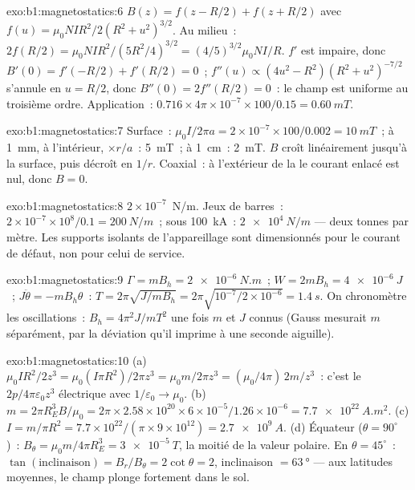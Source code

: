 \begin{solution}{exo:b1:magnetostatics:6}
$B(z) = f(z - R/2) + f(z + R/2)$ avec $f(u) = \mu_0NIR^2/2(R^2 + u^2)^{3/2}$.
Au milieu~: $2f(R/2) = \mu_0NIR^2/(5R^2/4)^{3/2} = (4/5)^{3/2}\mu_0NI/R$. $f'$ est
impaire, donc $B'(0) = f'(-R/2) + f'(R/2) = 0$~; $f''(u) \propto (4u^2 - R^2)(R^2 +
u^2)^{-7/2}$ s'annule en $u = R/2$, donc $B''(0) = 2f''(R/2) = 0$~: le champ est
uniforme au troisième ordre. Application~: $0.716 \times 4\pi \times 10^{-7} \times 100/0.15 =
\qty{0.60}{mT}$.
\end{solution}

\begin{solution}{exo:b1:magnetostatics:7}
Surface~: $\mu_0I/2\pi a = 2 \times 10^{-7} \times 100/0.002 = \qty{10}{mT}$~; à
\qty{1}{mm}, à l'intérieur, $\times r/a$~: \qty{5}{mT}~; à \qty{1}{cm}~: \qty{2}{mT}. $B$ croît
linéairement jusqu'à la surface, puis décroît en $1/r$. Coaxial~: à l'extérieur
de la  le courant enlacé est nul, donc $B = 0$.
\end{solution}

\begin{solution}{exo:b1:magnetostatics:8}
$2 \times 10^{-7}$~N/m. Jeux de barres~: $2 \times 10^{-7} \times 10^8/0.1 = \qty{200}{N/m}$~;
sous \qty{100}{kA}~: $\qty{2e4}{N/m}$ --- deux tonnes par mètre. Les supports
isolants de l'appareillage sont dimensionnés pour le courant de défaut, non
pour celui de service.
\end{solution}

\begin{solution}{exo:b1:magnetostatics:9}
$\Gamma = mB_h = \qty{2e-6}{N.m}$~; $W = 2mB_h = \qty{4e-6}{J}$~; $J\ddot\theta =
-mB_h\theta$~: $T = 2\pi\sqrt{J/mB_h} = 2\pi\sqrt{10^{-7}/2 \times 10^{-6}} =
\qty{1.4}{s}$. On chronomètre les oscillations~: $B_h = 4\pi^2J/mT^2$ une fois $m$ et $J$
connus (Gauss mesurait $m$ séparément, par la déviation qu'il imprime à une
seconde aiguille).
\end{solution}

\begin{solution}{exo:b1:magnetostatics:10}
(a) $\mu_0IR^2/2z^3 = \mu_0(I\pi R^2)/2\pi z^3 = \mu_0m/2\pi z^3 = (\mu_0/4\pi)\,2m/z^3$~:
c'est le $2p/4\pi\varepsilon_0z^3$ électrique avec $1/\varepsilon_0 \to \mu_0$. (b) $m = 2\pi R_E^3B/
\mu_0 = 2\pi \times 2.58 \times 10^{20} \times 6 \times 10^{-5}/1.26 \times 10^{-6} = \qty{7.7e22}{A.m^2}$.
(c) $I = m/\pi R^2 = 7.7 \times 10^{22}/(\pi \times 9 \times 10^{12}) = \qty{2.7e9}{A}$. (d)
Équateur ($\theta = 90^\circ$)~: $B_\theta = \mu_0m/4\pi R_E^3 = \qty{3e-5}{T}$, la moitié
de la valeur polaire. En $\theta = 45^\circ$~: $\tan(\text{inclinaison}) = B_r/B_\theta = 2\cot\theta = 2$,
inclinaison $= \qty{63}{\degree}$ --- aux latitudes moyennes, le champ plonge
fortement dans le sol.
\end{solution}

